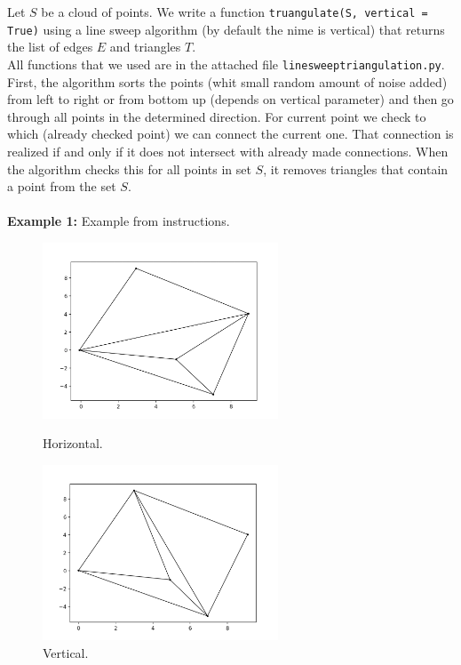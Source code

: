 \documentclass[a4paper,11pt]{article}
\begin{document}
Let $S$ be a cloud of points. We write a function \texttt{truangulate(S, vertical = True)} using a line sweep algorithm (by default the nime is vertical) that returns the list of edges $E$ and triangles $T$.
\\
All functions that we used are in the attached file \texttt{linesweeptriangulation.py}.
\\
First, the algorithm sorts the points (whit small random amount of noise added) from left to right or from bottom up (depends on vertical parameter) and then go through all points in the determined direction.
For current point we check to which (already checked point) we can connect the current one. That connection is realized if and only if it does not intersect with already made connections.
When the algorithm checks this for all points in set $S$, it removes triangles that contain a point from the set $S$.
\\
\\
\textbf{Example 1:} Example from instructions.
\begin{figure}[ht!]
    \begin{minipage}{0.5\textwidth}
        \centering
        \includegraphics[width=70mm]{prim_h.png}
        \caption{Horizontal.}
    \end{minipage}\hfill
    \begin{minipage}{0.5\textwidth}
        \centering
        \includegraphics[width=70mm]{prim_v.png}
        \caption{Vertical.}
    \end{minipage}\hfill
\end{figure}
\end{document}

